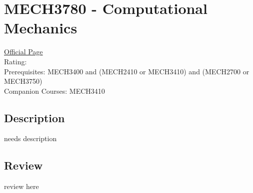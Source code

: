 \hypertarget{MECH3780}{\section{MECH3780 - Computational Mechanics}}

\large
\textcolor{turbo_purple}{\href{https://my.uq.edu.au/programs-courses/course.html?course_code=MECH3780}{Official Page}} \\
Rating: \cstar\cstar\cstar\cstar\ostar \\
Prerequisites: MECH3400 and (MECH2410 or MECH3410) and (MECH2700 or MECH3750) \\
Companion Courses: MECH3410

\normalsize
\subsection*{Description}
needs description

\subsection*{Review}
review here
